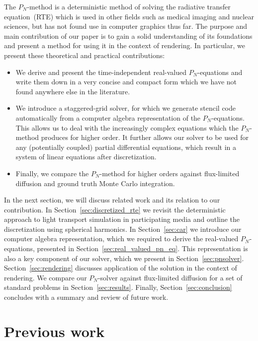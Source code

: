\documentclass{egpubl}
\newcommand{\nocontentsline}[3]{}
\newcommand{\tocless}[2]{\bgroup\let\addcontentsline=\nocontentsline#1{#2}\egroup}
\begin{document}
The $P_N$-method is a deterministic method of solving the radiative transfer equation~(RTE) which is used in other fields such as medical imaging and nuclear sciences, but has not found use in computer graphics thus far. The purpose and main contribution of our paper is to gain a solid understanding of its foundations and present a method for using it in the context of rendering. In particular, we present these theoretical and practical contributions:
\begin{itemize}
	\item We derive and present the time-independent real-valued $P_N$-equations and write them down in a very concise and compact form which we have not found anywhere else in the literature.
	\item We introduce a staggered-grid solver, for which we generate stencil code automatically from a computer algebra representation of the $P_N$-equations. This allows us to deal with the increasingly complex equations which the $P_N$-method produces for higher order. It further allows our solver to be used for any (potentially coupled) partial differential equations, which result in a system of linear equations after discretization.
	\item Finally, we compare the $P_N$-method for higher orders against flux-limited diffusion and ground truth Monte Carlo integration.
\end{itemize}

In the next section, we will discuss related work and its relation to our contribution. In Section~\ref{sec:discretized_rte} we revisit the deterministic approach to light transport simulation in participating media and outline the discretization using spherical harmonics. In Section~\ref{sec:car} we introduce our computer algebra representation, which we required to derive the real-valued $P_N$-equations, presented in Section~\ref{sec:real_valued_pn_eq}. This representation is also a key component of our solver, which we present in Section~\ref{sec:pnsolver}. Section~\ref{sec:rendering} discusses application of the solution in the context of rendering. We compare our $P_N$-solver against flux-limited diffusion for a set of standard problems in Section~\ref{sec:results}. Finally, Section~\ref{sec:conclusion} concludes with a summary and review of future work.


\tocless\section{Previous work}
\end{document}

